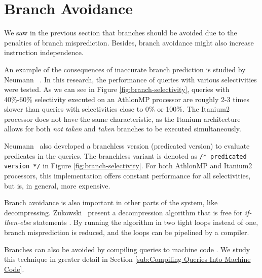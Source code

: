 \section{Branch Avoidance}
\label{sec:Branch Avoidance}

We saw in the previous section that branches should be avoided due to the penalties of branch misprediction. Besides, branch avoidance might also increase instruction independence.

An example of the consequences of inaccurate branch prediction is studied by Neumann \ea~\cite{Neumann2011-uq}. In this research, the performance of queries with various selectivities were tested. As we can see in Figure \ref{fig:branch-selectivity}, queries with 40\%-60\% selectivity executed on an AthlonMP processor are roughly 2-3 times slower than queries with selectivities close to 0\% or 100\%. The Itanium2 processor does not have the same characteristic, as the Itanium architecture allows for both \textit{not taken} and \textit{taken} branches to be executed simultaneously.

Neumann \ea~also developed a branchless version (predicated version) to evaluate predicates in the queries. The branchless variant is denoted as \texttt{/* predicated version */} in Figure \ref{fig:branch-selectivity}. For both AthlonMP and Itanium2 processors, this implementation offers constant performance for all selectivities, but is, in general, more expensive.

Branch avoidance is also important in other parts of the system, like decompressing. Zukowski \ea~present a decompression algorithm that is free for \textit{if-then-else} statements \cite{Zukowski2006-oz}. By running the algorithm in two tight loops instead of one, branch misprediction is reduced, and the loops can be pipelined by a compiler.

Branches can also be avoided by compiling queries to machine code \cite{Lamb2012-kg}. We study this technique in greater detail in Section \ref{sub:Compiling Queries Into Machine Code}.


